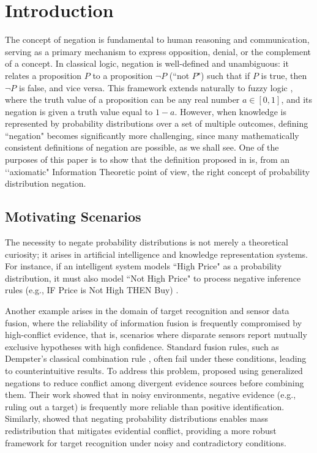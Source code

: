 \documentclass[pdflatex,sn-basic,iicol]{sn-jnl}%
\theoremstyle{thmstyleone}%
\theoremstyle{thmstyletwo}%
\theoremstyle{thmstylethree}%
\begin{document}
\section{Introduction}
The concept of negation is fundamental to human reasoning and communication, serving as a primary mechanism to express opposition, denial, or the complement of a concept. In classical logic, negation is well-defined and unambiguous: it relates a proposition $P$ to a proposition $\neg P$ (``not $P$") such that if $P$ is true, 
then $\neg P$ is false, and vice versa. This framework extends naturally to fuzzy logic \citep{Zadeh1965}, where the truth value of a proposition can be any real number $a \in [0, 1]$, and its negation is 
given a truth value equal to $1-a$. However, when knowledge is represented by probability distributions over a set of multiple outcomes, defining ``negation" becomes significantly more challenging, {since many mathematically consistent definitions of negation are possible, as 
we shall see. One of the purposes of this paper is  to show that the definition 
proposed in \citep{Yager2015} is, from an \lq\lq axiomatic" 
Information Theoretic point of view, the right concept of probability distribution negation.}

\subsection{Motivating Scenarios}\label{sec:motivations}

The necessity to negate probability distributions is not merely a theoretical curiosity; it arises in artificial intelligence and knowledge representation systems. For instance, if an intelligent system models ``High Price" as a probability distribution, it must also model ``Not High Price" to process negative inference rules (e.g., IF Price is Not High THEN Buy) \citep{generating,kreinovich2018beyond}. 

Another example arises in the domain of target recognition and sensor data fusion, where
the reliability of information fusion is frequently compromised by high-conflict evidence, that is,
scenarios where disparate sensors report mutually exclusive hypotheses with high confidence. Standard fusion rules, such as Dempster’s classical combination rule \citep{Dempster1967}, often fail under these conditions, leading to counterintuitive results. To address this problem, \cite{Gao+} proposed using generalized negations to reduce conflict among divergent evidence sources before combining them. Their work showed that in noisy environments, negative evidence (e.g., ruling out a target) is frequently more reliable than positive identification. Similarly, \cite{Xu+} showed that negating probability distributions enables mass redistribution that mitigates evidential conflict, providing a more robust framework for target recognition under noisy and contradictory conditions.
\end{document}
